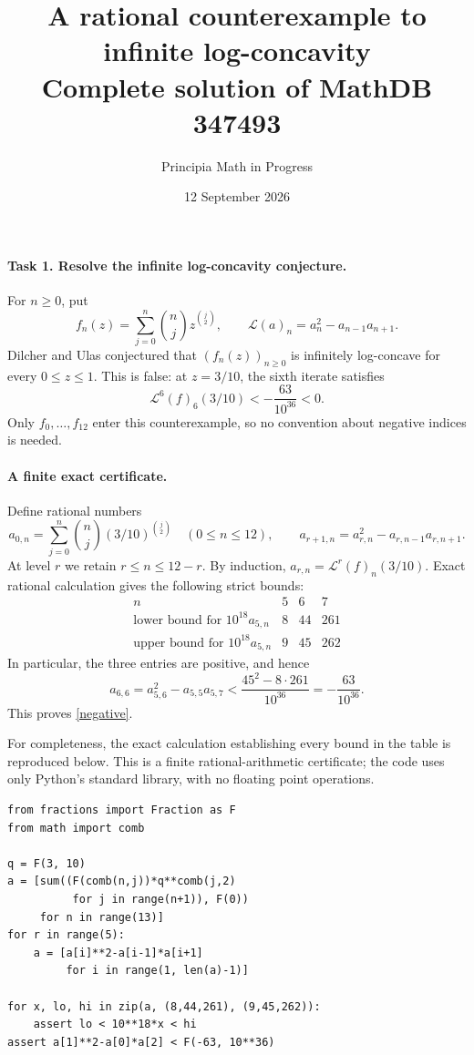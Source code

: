 \documentclass[11pt]{article}
\title{A rational counterexample to infinite log-concavity\\
\large Complete solution of MathDB 347493}
\author{Principia Math in Progress}
\date{12 September 2026}
\newcommand{\LL}{\mathcal L}
\begin{document}
\maketitle

\paragraph{Task 1. Resolve the infinite log-concavity conjecture.}
For $n\geq0$, put
\[
 f_n(z)=\sum_{j=0}^n\binom nj z^{\binom j2},
 \qquad
 \LL(a)_n=a_n^2-a_{n-1}a_{n+1}.
\]
Dilcher and Ulas conjectured that $(f_n(z))_{n\geq0}$ is infinitely
log-concave for every $0\leq z\leq1$.
This is false: at $z=3/10$, the sixth iterate satisfies
\begin{equation}\label{negative}
  \LL^6(f)_6(3/10)<-\frac{63}{10^{36}}<0.
\end{equation}
Only $f_0,\ldots,f_{12}$ enter this counterexample, so no convention
about negative indices is needed.

\paragraph{A finite exact certificate.}
Define rational numbers
\[
 a_{0,n}=\sum_{j=0}^n\binom nj(3/10)^{\binom j2}\quad(0\leq n\leq12),
 \qquad
 a_{r+1,n}=a_{r,n}^2-a_{r,n-1}a_{r,n+1}.
\]
At level $r$ we retain $r\leq n\leq12-r$. By induction,
$a_{r,n}=\LL^r(f)_n(3/10)$.
Exact rational calculation gives the following strict bounds:
\[
\begin{array}{c|ccc}
n&5&6&7\\ \hline
\text{lower bound for }10^{18}a_{5,n}&8&44&261\\
\text{upper bound for }10^{18}a_{5,n}&9&45&262
\end{array}
\]
In particular, the three entries are positive, and hence
\[
 a_{6,6}=a_{5,6}^2-a_{5,5}a_{5,7}
 <\frac{45^2-8\cdot261}{10^{36}}
 =-\frac{63}{10^{36}}.
\]
This proves \eqref{negative}.

For completeness, the exact calculation establishing every bound in
the table is reproduced below. This is a finite rational-arithmetic
certificate; the code uses only Python's standard library, with no
floating point operations.
\par\noindent\begin{minipage}{\linewidth}\small
\begin{verbatim}
from fractions import Fraction as F
from math import comb

q = F(3, 10)
a = [sum((F(comb(n,j))*q**comb(j,2)
          for j in range(n+1)), F(0))
     for n in range(13)]
for r in range(5):
    a = [a[i]**2-a[i-1]*a[i+1]
         for i in range(1, len(a)-1)]

for x, lo, hi in zip(a, (8,44,261), (9,45,262)):
    assert lo < 10**18*x < hi
assert a[1]**2-a[0]*a[2] < F(-63, 10**36)
\end{verbatim}
\end{minipage}
\end{document}
